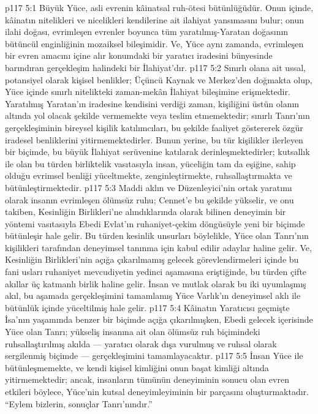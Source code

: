 \vs p117 5:1 Büyük Yüce, asli evrenin kâinatsal ruh\hyp{}ötesi bütünlüğüdür. Onun içinde, kâinatın nitelikleri ve nicelikleri kendilerine ait ilahiyat yansımasını bulur; onun ilahi doğası, evrimleşen evrenler boyunca tüm yaratılmış\hyp{}Yaratan doğasının bütüncül enginliğinin mozaiksel bileşimidir. Ve, Yüce aynı zamanda, evrimleşen bir evren amacını içine alır konumdaki bir yaratıcı iradesini bünyesinde barındıran gerçekleşim halindeki bir İlahiyat’dır.
\vs p117 5:2 Sınırlı olana ait ussal, potansiyel olarak kişisel benlikler; Üçüncü Kaynak ve Merkez’den doğmakta olup, Yüce içinde sınırlı nitelikteki zaman\hyp{}mekân İlahiyat bileşimine erişmektedir. Yaratılmış Yaratan’ın iradesine kendisini verdiği zaman, kişiliğini üstün olanın altında yol olacak şekilde vermemekte veya teslim etmemektedir; sınırlı Tanrı’nın gerçekleşiminin bireysel kişilik katılımcıları, bu şekilde faaliyet göstererek özgür iradesel benliklerini yitirmemektedirler. Bunun yerine, bu tür kişilikler ilerleyen bir biçimde, bu büyük İlahiyat serüvenine katılarak derinleşmektedirler; kutsallık ile olan bu türden birliktelik vasıtasıyla insan, yüceliğin tam da eşiğine, sahip olduğu evrimsel benliği yüceltmekte, zenginleştirmekte, ruhsallaştırmakta ve bütünleştirmektedir.
\vs p117 5:3 Maddi aklın ve Düzenleyici’nin ortak yaratımı olarak insanın evrimleşen ölümsüz ruhu; Cennet’e bu şekilde yükselir, ve onu takiben, Kesinliğin Birlikleri’ne alındıklarında olarak bilinen deneyimin bir yöntemi vasıtasıyla Ebedi Evlat’ın ruhaniyet\hyp{}çekim döngüsüyle yeni bir biçimde bütünleşir hale gelir. Bu türden kesinlik unsurları böylelikle, Yüce olan Tanrı’nın kişilikleri tarafından deneyimsel tanınma için kabul edilir adaylar haline gelir. Ve, Kesinliğin Birlikleri’nin açığa çıkarılmamış gelecek görevlendirmeleri içinde bu fani usları ruhaniyet mevcudiyetin yedinci aşamasına eriştiğinde, bu türden çifte akıllar üç katmanlı birlik haline gelir. İnsan ve mutlak olarak bu iki uyumlaşmış akıl, bu aşamada gerçekleşimini tamamlamış Yüce Varlık’ın deneyimsel aklı ile bütünlük içinde yüceltilmiş hale gelir.
\vs p117 5:4 Kâinatın Yaratıcısı geçmişte İsa’nın yaşamında benzer bir biçimde açığa çıkarılmışken, Ebedi gelecek içerisinde Yüce olan Tanrı; yükseliş insanına ait olan ölümsüz ruh biçimindeki ruhsallaştırılmış akılda --- yaratıcı olarak dışa vurulmuş ve ruhsal olarak sergilenmiş biçimde --- gerçekleşimini tamamlayacaktır.
\vs p117 5:5 İnsan Yüce ile bütünleşmemekte, ve kendi kişisel kimliğini onun başat kimliği altında yitirmemektedir; ancak, insanların tümünün deneyiminin sonucu olan evren etkileri böylece, Yüce’nin kutsal deneyimleyiminin bir parçasını oluşturmaktadır. “Eylem bizlerin, sonuçlar Tanrı’nındır.”

